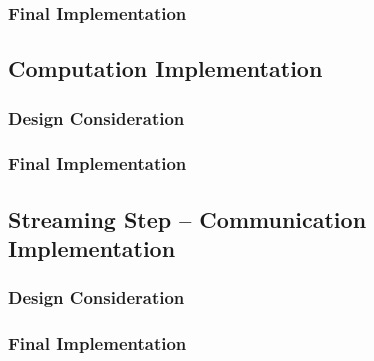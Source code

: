 \subsubsection{Final Implementation}

\subsection{Computation Implementation} \label{sec:cp}
\subsubsection{Design Consideration}
\subsubsection{Final Implementation}

\subsection{Streaming Step -- Communication Implementation} \label{sec:ssc}
\subsubsection{Design Consideration}
\subsubsection{Final Implementation}